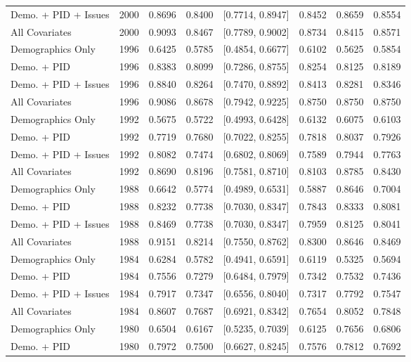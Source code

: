 \begin{longtable}{lrrrlrrr}
  Demo. + PID + Issues & 2000 & 0.8696 & 0.8400 & [0.7714, 0.8947] & 0.8452 & 0.8659 & 0.8554 \\ 
  All Covariates & 2000 & 0.9093 & 0.8467 & [0.7789, 0.9002] & 0.8734 & 0.8415 & 0.8571 \\ 
  Demographics Only & 1996 & 0.6425 & 0.5785 & [0.4854, 0.6677] & 0.6102 & 0.5625 & 0.5854 \\ 
  Demo. + PID & 1996 & 0.8383 & 0.8099 & [0.7286, 0.8755] & 0.8254 & 0.8125 & 0.8189 \\ 
  Demo. + PID + Issues & 1996 & 0.8840 & 0.8264 & [0.7470, 0.8892] & 0.8413 & 0.8281 & 0.8346 \\ 
  All Covariates & 1996 & 0.9086 & 0.8678 & [0.7942, 0.9225] & 0.8750 & 0.8750 & 0.8750 \\ 
  Demographics Only & 1992 & 0.5675 & 0.5722 & [0.4993, 0.6428] & 0.6132 & 0.6075 & 0.6103 \\ 
  Demo. + PID & 1992 & 0.7719 & 0.7680 & [0.7022, 0.8255] & 0.7818 & 0.8037 & 0.7926 \\ 
  Demo. + PID + Issues & 1992 & 0.8082 & 0.7474 & [0.6802, 0.8069] & 0.7589 & 0.7944 & 0.7763 \\ 
  All Covariates & 1992 & 0.8690 & 0.8196 & [0.7581, 0.8710] & 0.8103 & 0.8785 & 0.8430 \\ 
  Demographics Only & 1988 & 0.6642 & 0.5774 & [0.4989, 0.6531] & 0.5887 & 0.8646 & 0.7004 \\ 
  Demo. + PID & 1988 & 0.8232 & 0.7738 & [0.7030, 0.8347] & 0.7843 & 0.8333 & 0.8081 \\ 
  Demo. + PID + Issues & 1988 & 0.8469 & 0.7738 & [0.7030, 0.8347] & 0.7959 & 0.8125 & 0.8041 \\ 
  All Covariates & 1988 & 0.9151 & 0.8214 & [0.7550, 0.8762] & 0.8300 & 0.8646 & 0.8469 \\ 
  Demographics Only & 1984 & 0.6284 & 0.5782 & [0.4941, 0.6591] & 0.6119 & 0.5325 & 0.5694 \\ 
  Demo. + PID & 1984 & 0.7556 & 0.7279 & [0.6484, 0.7979] & 0.7342 & 0.7532 & 0.7436 \\ 
  Demo. + PID + Issues & 1984 & 0.7917 & 0.7347 & [0.6556, 0.8040] & 0.7317 & 0.7792 & 0.7547 \\ 
  All Covariates & 1984 & 0.8607 & 0.7687 & [0.6921, 0.8342] & 0.7654 & 0.8052 & 0.7848 \\ 
  Demographics Only & 1980 & 0.6504 & 0.6167 & [0.5235, 0.7039] & 0.6125 & 0.7656 & 0.6806 \\ 
  Demo. + PID & 1980 & 0.7972 & 0.7500 & [0.6627, 0.8245] & 0.7576 & 0.7812 & 0.7692 \\ 

\end{longtable}
